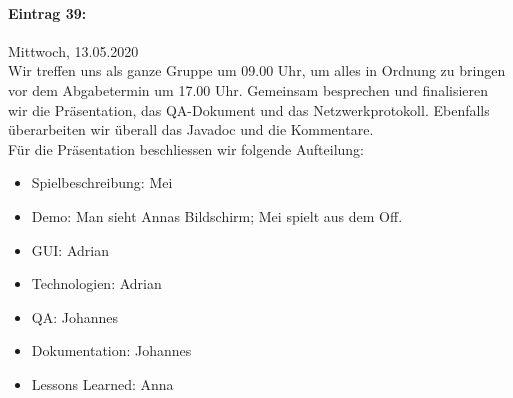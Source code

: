 \documentclass[12pt]{article}
\begin{document}
\paragraph{Eintrag 39:}
Mittwoch, 13.05.2020\\
Wir treffen uns als ganze Gruppe um 09.00 Uhr, um alles in Ordnung zu bringen vor dem Abgabetermin um 17.00 Uhr. Gemeinsam besprechen und finalisieren wir die Pr\"asentation, das QA-Dokument und das Netzwerkprotokoll. Ebenfalls \"uberarbeiten wir \"uberall das Javadoc und die Kommentare.\\
F\"ur die Pr\"asentation beschliessen wir folgende Aufteilung: 
\begin{itemize}
\item Spielbeschreibung: Mei
\item Demo: Man sieht Annas Bildschirm; Mei spielt aus dem Off.
\item GUI: Adrian
\item Technologien: Adrian
\item QA: Johannes
\item Dokumentation: Johannes
\item Lessons Learned: Anna
\end{itemize}
\end{document}
